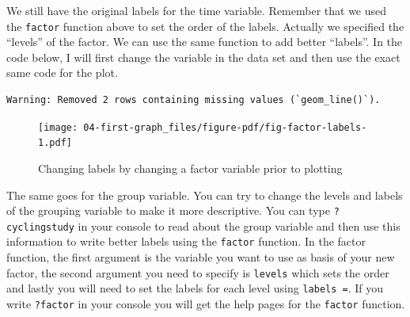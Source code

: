 \documentclass[
  11pt,
  letterpaper,
]{scrbook}
\newenvironment{Shaded}{\begin{snugshade}}{\end{snugshade}}
\newcommand{\AttributeTok}[1]{\textcolor[rgb]{0.40,0.45,0.13}{#1}}
\newcommand{\FunctionTok}[1]{\textcolor[rgb]{0.28,0.35,0.67}{#1}}
\newcommand{\NormalTok}[1]{\textcolor[rgb]{0.00,0.23,0.31}{#1}}
\newcommand{\OtherTok}[1]{\textcolor[rgb]{0.00,0.23,0.31}{#1}}
\newcommand{\SpecialCharTok}[1]{\textcolor[rgb]{0.37,0.37,0.37}{#1}}
\newcommand{\StringTok}[1]{\textcolor[rgb]{0.13,0.47,0.30}{#1}}
\begin{document}
We still have the original labels for the time variable. Remember that
we used the \texttt{factor} function above to set the order of the
labels. Actually we specified the ``levels'' of the factor. We can use
the same function to add better ``labels''. In the code below, I will
first change the variable in the data set and then use the exact same
code for the plot.

\begin{Shaded}
\end{Shaded}

\begin{verbatim}
Warning: Removed 2 rows containing missing values (`geom_line()`).
\end{verbatim}

\begin{figure}[H]

{\centering \texttt{[image: 04-first-graph\_files/figure-pdf/fig-factor-labels-1.pdf]}

}

\caption{\label{fig-factor-labels}Changing labels by changing a factor
variable prior to plotting}

\end{figure}

The same goes for the group variable. You can try to change the levels
and labels of the grouping variable to make it more descriptive. You can
type \texttt{?cyclingstudy} in your console to read about the group
variable and then use this information to write better labels using the
\texttt{factor} function. In the factor function, the first argument is
the variable you want to use as basis of your new factor, the second
argument you need to specify is \texttt{levels} which sets the order and
lastly you will need to set the labels for each level using
\texttt{labels\ =}. If you write \texttt{?factor} in your console you
will get the help pages for the \texttt{factor} function.
\end{document}
